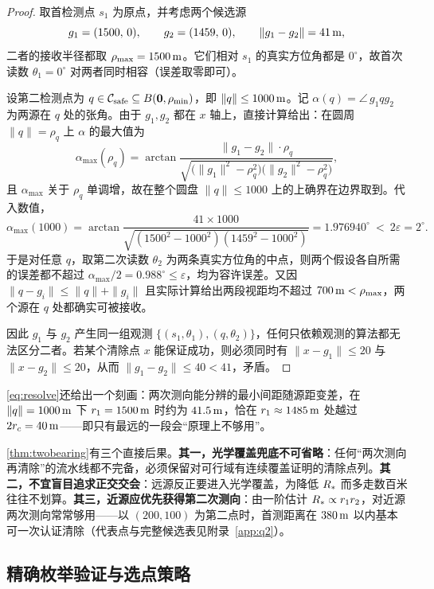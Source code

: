 \begin{proof}
取首检测点 $s_1$ 为原点，并考虑两个候选源
\[
  g_1=(1500,\,0),\qquad g_2=(1459,\,0),\qquad \|g_1-g_2\|=41\,\mathrm{m} ,
\]
二者的接收半径都取 $\rho_{\max}=1500\,\mathrm{m}$。它们相对 $s_1$ 的真实方位角都是 $0^\circ$，故首次读数 $\theta_1=0^\circ$ 对两者同时相容（误差取零即可）。

设第二检测点为 $q\in\mathcal C_{\rm safe}\subseteq B(\bm 0,\rho_{\min})$，即 $\|q\|\le1000\,\mathrm{m}$。记 $\alpha(q)=\angle\,g_1qg_2$ 为两源在 $q$ 处的张角。由于 $g_1,g_2$ 都在 $x$ 轴上，直接计算给出：在圆周 $\|q\|=\rho_q$ 上 $\alpha$ 的最大值为
\begin{equation}\label{eq:resolve}
  \alpha_{\max}(\rho_q)=\arctan\frac{\|g_1-g_2\|\cdot\rho_q}
       {\sqrt{\bigl(\|g_1\|^2-\rho_q^2\bigr)\bigl(\|g_2\|^2-\rho_q^2\bigr)}},
\end{equation}
且 $\alpha_{\max}$ 关于 $\rho_q$ 单调增，故在整个圆盘 $\|q\|\le1000$ 上的上确界在边界取到。代入数值，
\[
  \alpha_{\max}(1000)=\arctan\frac{41\times1000}{\sqrt{(1500^2-1000^2)(1459^2-1000^2)}}
  =1.976940^\circ\ <\ 2\varepsilon=2^\circ .
\]
于是对任意 $q$，取第二次读数 $\theta_2$ 为两条真实方位角的中点，则两个假设各自所需的误差都不超过 $\alpha_{\max}/2=0.988^\circ\le\varepsilon$，均为容许误差。又因 $\|q-g_i\|\le\|q\|+\|g_i\|$ 且实际计算给出两段视距均不超过 $700\,\mathrm{m}<\rho_{\max}$，两个源在 $q$ 处都确实可被接收。

因此 $g_1$ 与 $g_2$ 产生同一组观测 $\{(s_1,\theta_1),(q,\theta_2)\}$，任何只依赖观测的算法都无法区分二者。若某个清除点 $x$ 能保证成功，则必须同时有 $\|x-g_1\|\le20$ 与 $\|x-g_2\|\le20$，从而 $\|g_1-g_2\|\le40<41$，矛盾。
\end{proof}

\cref{eq:resolve}还给出一个刻画：两次测向能分辨的最小间距随源距变差，在 $\|q\|=1000\,\mathrm{m}$ 下 $r_1=1500\,\mathrm{m}$ 时约为 $41.5\,\mathrm{m}$，恰在 $r_1\approx1485\,\mathrm{m}$ 处越过 $2r_c=40\,\mathrm{m}$——即只有最远的一段会“原理上不够用”。

\cref{thm:twobearing}有三个直接后果。\textbf{其一，光学覆盖兜底不可省略}：任何“两次测向再清除”的流水线都不完备，必须保留对可行域有连续覆盖证明的清除点列。\textbf{其二，不宜盲目追求正交交会}：远源反正要进入光学覆盖，为降低 $R_{*}$ 而多走数百米往往不划算。\textbf{其三，近源应优先获得第二次测向}：由一阶估计 $R_{*}\propto r_1r_2$，对近源两次测向常常够用——以 $(200,100)$ 为第二点时，首测距离在 $380\,\mathrm{m}$ 以内基本可一次认证清除（代表点与完整候选表见附录~\ref{app:q2}）。

\subsection{精确枚举验证与选点策略}

